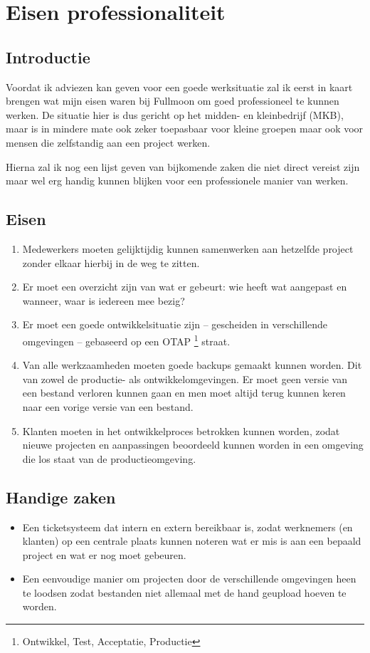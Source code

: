 \chapter{Eisen professionaliteit}

\section{Introductie}

Voordat ik adviezen kan geven voor een goede werksituatie zal ik eerst in kaart brengen wat mijn eisen waren bij Fullmoon om goed professioneel te kunnen werken. De situatie hier is dus gericht op het midden- en kleinbedrijf (MKB), maar is in mindere mate ook zeker toepasbaar voor kleine groepen maar ook voor mensen die zelfstandig aan een project werken.

Hierna zal ik nog een lijst geven van bijkomende zaken die niet direct vereist zijn maar wel erg handig kunnen blijken voor een professionele manier van werken.

\section{Eisen}

\begin{enumerate}
  \item Medewerkers moeten gelijktijdig kunnen samenwerken aan hetzelfde project zonder elkaar hierbij in de weg te zitten.
  \item Er moet een overzicht zijn van wat er gebeurt: wie heeft wat aangepast en wanneer, waar is iedereen mee bezig?
  \item Er moet een goede ontwikkelsituatie zijn -- gescheiden in verschillende omgevingen -- gebaseerd op een OTAP \footnote{Ontwikkel, Test, Acceptatie, Productie} straat.
  \item Van alle werkzaamheden moeten goede backups gemaakt kunnen worden. Dit van zowel de productie- als ontwikkelomgevingen. Er moet geen versie van een bestand verloren kunnen gaan en men moet altijd terug kunnen keren naar een vorige versie van een bestand.
  \item Klanten moeten in het ontwikkelproces betrokken kunnen worden, zodat nieuwe projecten en aanpassingen beoordeeld kunnen worden in een omgeving die los staat van de productieomgeving.
\end{enumerate}

\section{Handige zaken}

\begin{itemize}
  \item Een ticketsysteem dat intern en extern bereikbaar is, zodat werknemers (en klanten) op een centrale plaats kunnen noteren wat er mis is aan een bepaald project en wat er nog moet gebeuren.
  \item Een eenvoudige manier om projecten door de verschillende omgevingen heen te loodsen zodat bestanden niet allemaal met de hand geupload hoeven te worden.
\end{itemize}
